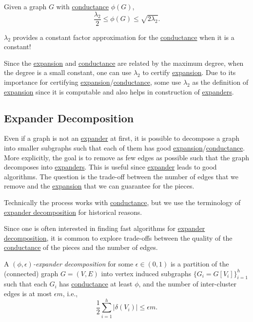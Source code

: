 \begin{theorem}\label{thm:Cheeger-inequality}
	Given a graph \(G\) with \hyperref[def:conductance]{conductance} \(\phi (G)\),
	\[
		\frac{\lambda _2}{2}
		\leq \phi (G)
		\leq \sqrt{2 \lambda _2}.
	\]
\end{theorem}

\begin{remark}
	\(\lambda _2\) provides a constant factor approximation for the \hyperref[def:conductance]{conductance} when it is a constant!
\end{remark}

Since the \hyperref[def:expansion]{expansion} and \hyperref[def:conductance]{conductance} are related by the maximum degree, when the degree is a small constant, one can use \(\lambda _2\) to certify \hyperref[def:expansion]{expansion}. Due to its importance for certifying \hyperref[def:expansion]{expansion}/\hyperref[def:conductance]{conductance}, some use \(\lambda _2\) as the definition of \hyperref[def:expansion]{expansion} since it is computable and also helps in construction of \hyperref[def:expander]{expanders}.

\subsection{Expander Decomposition}
Even if a graph is not an \hyperref[def:expander]{expander} at first, it is possible to decompose a graph into smaller subgraphs such that each of them has good \hyperref[def:expansion]{expansion}/\hyperref[def:conductance]{conductance}. More explicitly, the goal is to remove as few edges as possible such that the graph decomposes into \hyperref[def:expander]{expanders}. This is useful since \hyperref[def:expander]{expander} leads to good algorithms. The question is the trade-off between the number of edges that we remove and the \hyperref[def:expansion]{expansion} that we can guarantee for the pieces.

\begin{notation}
	Technically the process works with \hyperref[def:conductance]{conductance}, but we use the terminology of \hyperref[def:expander-decomposition]{expander decomposition} for historical reasons.
\end{notation}

Since one is often interested in finding fast algorithms for \hyperref[def:expander-decomposition]{expander decomposition}, it is common to explore trade-offs between the quality of the \hyperref[def:conductance]{conductance} of the pieces and the number of edges.

\begin{definition}\label{def:expander-decomposition}
	A \emph{\((\phi, \epsilon )\)-expander decomposition} for some \(\epsilon \in (0, 1)\) is a partition of the (connected) graph \(G = (V, E)\) into vertex induced subgraphs \(\{ G_i = G[V_i] \}_{i=1}^{h} \) such that each \(G_i\) has \hyperref[def:conductance]{conductance} at least \(\phi \), and the number of inter-cluster edges is at most \(\epsilon m\), i.e.,
	\[
		\frac{1}{2} \sum_{i=1}^{h} \lvert \delta (V_i) \rvert
		\leq \epsilon m.
	\]
\end{definition}